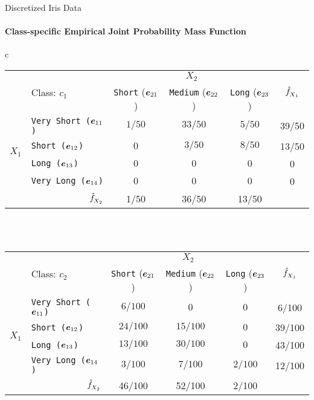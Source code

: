 \begin{frame}{Discretized Iris Data}
\framesubtitle{Class-specif\/{i}c Empirical Joint Probability Mass Function}
\label{tab:class:prob:jepmf}%
\footnotesize{
{\begin{tabular}{c}
  \renewcommand{\arraystretch}{1.1}\begin{tabular}{|c|l||c|c|c||c|}
    \hline
    & \multirow{2}{*}{Class: $c_1$}&\multicolumn{3}{c||}{$X_2$} &
    \multirow{2}{*}{$\kern3pt\hat{\kern-3pt f}_{\!X_1}$}\\
    \cline{3-5}
        & & {\tt Short} (${\boldsymbol e}_{21}$) & {\tt Medium} (${\boldsymbol e}_{22}$) &
        {\tt Long} (${\boldsymbol e}_{23}$) & \\
        \hline\hline
        \multirow{4}{*}{$X_1$}
        & {\tt Very Short (${\boldsymbol e}_{11}$)} &  ${1/50}$  &
        ${33/50}$  & ${5/50}$ & 39/50\\
        &{\tt Short (${\boldsymbol e}_{12}$)} & $0$
        &${3/50}$  & ${8/50}$ & 13/50\\
        &{\tt Long (${\boldsymbol e}_{13}$)} & $0$  &
        $0$   & $0$ & 0\\
        &{\tt Very Long (${\boldsymbol e}_{14}$)} & $0$  &
        $0$ & $0$ & 0\\
    \hline
    \multicolumn{2}{|r||}{$\kern3pt\hat{\kern-3pt f}_{\!X_2}$} & 1/50 & 36/50 & 13/50 & \\
    \hline
  \end{tabular}\\[12pt]\\
 \renewcommand{\arraystretch}{1.1}\begin{tabular}{|c|l||c|c|c||c|}
    \hline
    & \multirow{2}{*}{Class: $c_2$}&\multicolumn{3}{c||}{$X_2$} &
    \multirow{2}{*}{$\kern3pt\hat{\kern-3pt f}_{\!X_1}$}\\
    \cline{3-5}
        & & {\tt Short} (${\boldsymbol e}_{21}$) & {\tt Medium} (${\boldsymbol e}_{22}$) &
        {\tt Long} (${\boldsymbol e}_{23}$) & \\
        \hline\hline
        \multirow{4}{*}{$X_1$}
        & {\tt Very Short (${\boldsymbol e}_{11}$)} &  ${6/100}$  &
        ${0}$  & $0$ & 6/100\\
        &{\tt Short (${\boldsymbol e}_{12}$)} & ${24/100}$
        &${15/100}$  &      ${0}$ & 39/100\\
        &{\tt Long (${\boldsymbol e}_{13}$)} & ${13/100}$  &
        ${30/100}$   &      ${0}$ & 43/100\\
        &{\tt Very Long (${\boldsymbol e}_{14}$)} & ${3/100}$  &
        ${7/100}$       & ${2/100}$ & 12/100\\
    \hline
    \multicolumn{2}{|r||}{$\kern3pt\hat{\kern-3pt f}_{\!X_2}$} & 46/100 & 52/100 & 2/100 &\\
    \hline
  \end{tabular}\\
\end{tabular}}{}
}
\end{frame}




